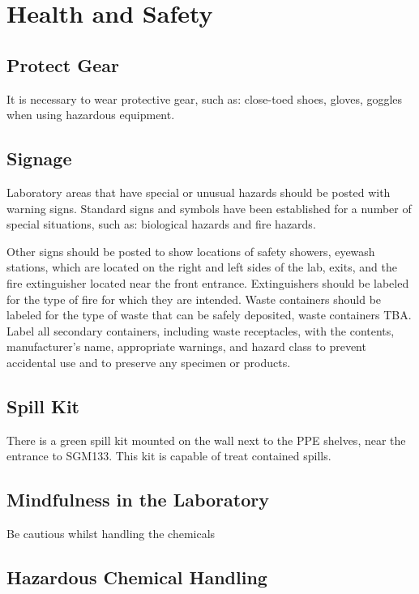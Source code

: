\documentclass[12pt]{../SOP3}\usepackage[]{graphicx}\usepackage[]{color}
\begin{document}
\section{Health and Safety}

\subsection{Protect Gear}

\NP It is necessary to wear protective gear, such as: close-toed shoes, gloves, goggles when using hazardous equipment.

\subsection{Signage}

\NP Laboratory areas that have special or unusual hazards should be posted with warning signs. Standard signs and symbols have been established for a number of special situations, such as: biological hazards and fire hazards.

\NP Other signs should be posted to show locations of safety showers, eyewash stations, which are located on the right and left sides of the lab, exits, and the fire extinguisher located near the front entrance. Extinguishers should be labeled for the type of fire for which they are intended. Waste containers should be labeled for the type of waste that can be safely deposited, waste containers TBA. Label all secondary containers, including waste receptacles, with the contents, manufacturer's name, appropriate warnings, and hazard class to prevent accidental use and to preserve any specimen or products. 

\subsection{Spill Kit} 

\NP There is a green spill kit mounted on the wall next to the PPE shelves, near the entrance to SGM133. This kit is capable of treat contained spills.

\subsection{Mindfulness in the Laboratory}

Be cautious whilst handling the chemicals

\subsection{Hazardous Chemical Handling}
\end{document}
